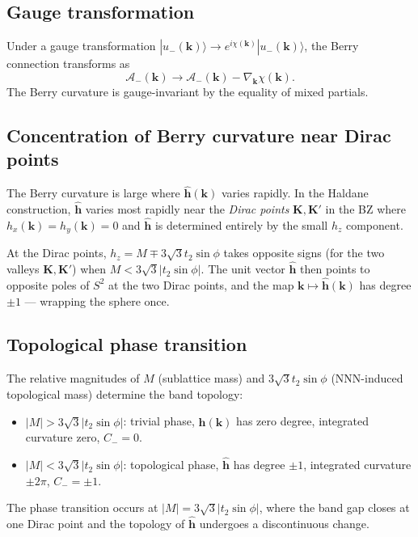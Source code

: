\documentclass[11pt,a4paper]{article}
\begin{document}
\subsection{Gauge transformation}

Under a gauge transformation $|u_-(\mathbf{k})\rangle \to e^{i\chi(\mathbf{k})}|u_-(\mathbf{k})\rangle$, the Berry connection transforms as
\[
\mathcal{A}_-(\mathbf{k}) \to \mathcal{A}_-(\mathbf{k}) - \nabla_\mathbf{k}\chi(\mathbf{k}).
\]
The Berry curvature is gauge-invariant by the equality of mixed partials.

\subsection{Concentration of Berry curvature near Dirac points}

The Berry curvature is large where $\hat{\mathbf{h}}(\mathbf{k})$ varies rapidly. In the Haldane construction, $\hat{\mathbf{h}}$ varies most rapidly near the \emph{Dirac points} $\mathbf{K}, \mathbf{K}'$ in the BZ where $h_x(\mathbf{k}) = h_y(\mathbf{k}) = 0$ and $\hat{\mathbf{h}}$ is determined entirely by the small $h_z$ component.

At the Dirac points, $h_z = M \mp 3\sqrt{3}t_2\sin\phi$ takes opposite signs (for the two valleys $\mathbf{K}, \mathbf{K}'$) when $M < 3\sqrt{3}|t_2\sin\phi|$. The unit vector $\hat{\mathbf{h}}$ then points to opposite poles of $S^2$ at the two Dirac points, and the map $\mathbf{k}\mapsto\hat{\mathbf{h}}(\mathbf{k})$ has degree $\pm 1$ --- wrapping the sphere once.

\subsection{Topological phase transition}

The relative magnitudes of $M$ (sublattice mass) and $3\sqrt{3}t_2\sin\phi$ (NNN-induced topological mass) determine the band topology:

\begin{itemize}[noitemsep]
  \item $|M| > 3\sqrt{3}|t_2\sin\phi|$: trivial phase, $\hat{\mathbf{h}}(\mathbf{k})$ has zero degree, integrated curvature zero, $C_- = 0$.
  \item $|M| < 3\sqrt{3}|t_2\sin\phi|$: topological phase, $\hat{\mathbf{h}}$ has degree $\pm 1$, integrated curvature $\pm 2\pi$, $C_- = \pm 1$.
\end{itemize}

The phase transition occurs at $|M| = 3\sqrt{3}|t_2\sin\phi|$, where the band gap closes at one Dirac point and the topology of $\hat{\mathbf{h}}$ undergoes a discontinuous change.
\end{document}
